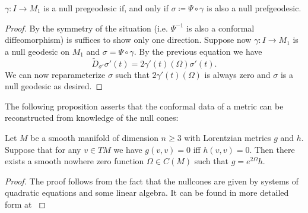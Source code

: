 \begin{proposition}\label{prop:pregeodesicconformal}
    $\gamma:I\to M_1$ is a null pregeodesic if, and only if $\sigma\coloneqq\Psi\circ\gamma$ is also a null prefgeodesic. 
\end{proposition}
\begin{proof}
By the symmetry of the situation (i.e. $\Psi^{-1}$ is also a conformal diffeomorphism) is suffices to show only one direction.
Suppose now $\gamma:I\to M_1$ is a null geodesic on $M_1$ and $\sigma=\Psi\circ\gamma$. 
By the previous equation we have 
\[
\widetilde{D}_{\sigma'}\sigma'(t) = 2\gamma'(t)(\Omega)\sigma'(t).
\]
We can now reparameterize $\sigma$  such that $2\gamma'(t)(\Omega)$ is always zero and $\sigma$ is a null geodesic as desired.
\end{proof}

The following proposition asserts that the conformal data of a metric can be reconstructed from knowledge of the null cones:
\begin{proposition}\label{prop:metricfromnullcone}
Let $M$ be a smooth manifold of dimension $n\geq 3$ with Lorentzian metrics $g$ and $h$. Suppose that for any $v\in TM$ we have $g(v,v)=0$ iff $h(v,v)=0$. Then there exists a smooth nowhere zero function $\Omega\in C(M)$ such that $g = e^{2\Omega}h$.
\end{proposition}
\begin{proof}
The proof follows from the fact that the nullcones are given by systems of quadratic equations and some linear algebra. It can be found in more detailed form at \cite[Theorem 2.3]{beem}
\end{proof}

